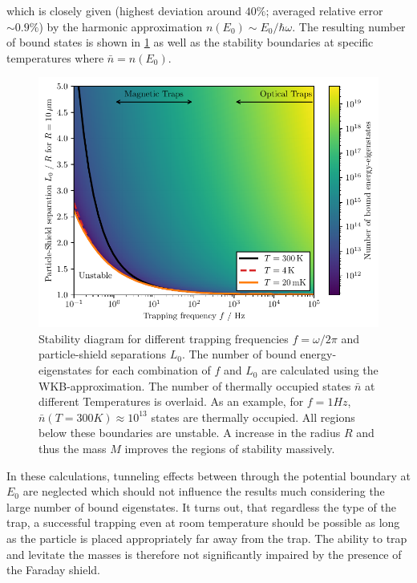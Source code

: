 which is closely given (highest deviation around $40\%$; averaged relative error $\sim 0.9\%$) by the harmonic approximation $n(E_0) \sim E_0 / \hbar \omega$.
The resulting number of bound states is shown in \cref{fig:4:trap-stability} as well as the stability boundaries at specific temperatures where $\bar{n} = n(E_0)$.
\begin{figure}[!htbp]
  \centering
  \includegraphics[width=\textwidth]{./../figures/others/trap-stability-with-R.pdf}
  \caption{Stability diagram for different trapping frequencies $f = \omega/2\pi$ and particle-shield separations $L_0$. The number of bound energy-eigenstates for each combination of $f$ and $L_0$ are calculated using the WKB-approximation. The number of thermally occupied states $\bar{n}$ at different Temperatures is overlaid. As an example, for $f=1\si{Hz}$, $\bar{n}(T=300\si{K})\approx 10^{13}$ states are thermally occupied. All regions below these boundaries are unstable. A increase in the radius $R$ and thus the mass $M$ improves the regions of stability massively.}
  \label{fig:4:trap-stability}
\end{figure}
In these calculations, tunneling effects between through the potential boundary at $E_0$ are neglected which should not influence the results much considering the large number of bound eigenstates.
It turns out, that regardless the type of the trap, a successful trapping even at room temperature should be possible as long as the particle is placed appropriately far away from the trap.
The ability to trap and levitate the masses is therefore not significantly impaired by the presence of the Faraday shield.